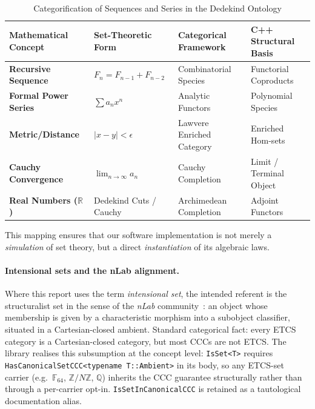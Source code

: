 \documentclass[11pt, a4paper]{report}
\begin{document}
\begin{table}[ht]
\centering
\caption{Categorification of Sequences and Series in the Dedekind Ontology}
\label{table:categorification}
\begin{tabular}{@{}llll@{}} 
\toprule
\textbf{Mathematical Concept} & \textbf{Set-Theoretic Form} & \textbf{Categorical Framework} & \textbf{C++ Structural Basis} \\ \midrule
\textbf{Recursive Sequence}    & $F_{n} = F_{n-1} + F_{n-2}$ & Combinatorial Species \cite{joyal1981species} & Functorial Coproducts \\
\textbf{Formal Power Series}  & $\sum a_n x^n$              & Analytic Functors \cite{joyal1986analytic}    & Polynomial Species \\
\textbf{Metric/Distance}      & $|x - y| < \epsilon$        & Lawvere Enriched Category \cite{lawvere1973metric} & Enriched Hom-sets \\
\textbf{Cauchy Convergence}   & $\lim_{n \to \infty} a_n$   & Cauchy Completion \cite{borceux1986cauchy}    & Limit / Terminal Object \\
\textbf{Real Numbers ($\mathbb{R}$)} & Dedekind Cuts / Cauchy & Archimedean Completion \cite{mclarty1992toposes} & Adjoint Functors \\ \bottomrule
\end{tabular}
\end{table}


\noindent This mapping ensures that our software implementation is not merely a \textit{simulation} of set theory, but a direct \textit{instantiation} of its algebraic laws.

\paragraph{Intensional sets and the nLab alignment.} Where this report uses the term \emph{intensional set}, the intended referent is the structuralist set in the sense of the \emph{nLab} community~\cite{nlab:structural_set_theory}: an object whose membership is given by a characteristic morphism into a subobject classifier, situated in a Cartesian-closed ambient. Standard categorical fact: every ETCS category is a Cartesian-closed category, but most CCCs are not ETCS. The library realises this subsumption at the concept level: \texttt{IsSet<T>} requires \texttt{HasCanonicalSetCCC<typename T::Ambient>} in its body, so any ETCS-set carrier (e.g.\ $\mathbb{F}_{64}$, $\mathbb{Z}/N\mathbb{Z}$, $\mathbb{Q}$) inherits the CCC guarantee structurally rather than through a per-carrier opt-in. \texttt{IsSetInCanonicalCCC} is retained as a tautological documentation alias.
\end{document}
